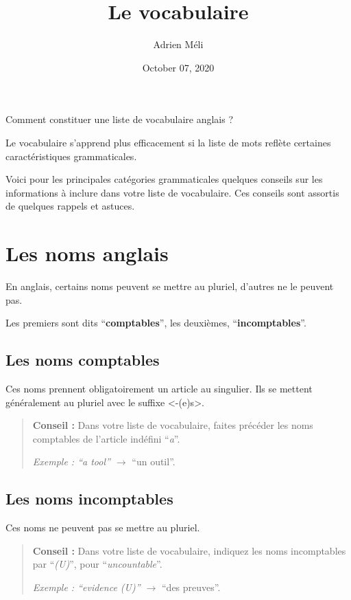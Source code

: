 \documentclass[
  10pt,
]{article}
\title{Le vocabulaire}
\author{Adrien Méli}
\date{October 07, 2020}
\begin{document}
\maketitle

{
\setcounter{tocdepth}{1}
\tableofcontents
}
Comment constituer une liste de vocabulaire anglais ?

Le vocabulaire s'apprend plus efficacement si la liste de mots reflète certaines caractéristiques grammaticales.

Voici pour les principales catégories grammaticales quelques conseils sur les informations à inclure dans votre liste de vocabulaire.
Ces conseils sont assortis de quelques rappels et astuces.

\hypertarget{les-noms-anglais}{%
\section{Les noms anglais}\label{les-noms-anglais}}

En anglais, certains noms peuvent se mettre au pluriel, d'autres ne le peuvent pas.

Les premiers sont dits ``\textbf{comptables}'', les deuxièmes, ``\textbf{incomptables}''.

\hypertarget{les-noms-comptables}{%
\subsection{Les noms comptables}\label{les-noms-comptables}}

Ces noms prennent obligatoirement un article au singulier.
Ils se mettent généralement au pluriel avec le suffixe \textless-(e)s\textgreater.

\begin{quote}
\textbf{Conseil :} Dans votre liste de vocabulaire, faites précéder les noms comptables de l'article indéfini ``\emph{a}''.

\emph{Exemple : ``a tool'' \(\rightarrow\)} ``un outil''.
\end{quote}

\hypertarget{les-noms-incomptables}{%
\subsection{Les noms incomptables}\label{les-noms-incomptables}}

Ces noms ne peuvent pas se mettre au pluriel.

\begin{quote}
\textbf{Conseil :} Dans votre liste de vocabulaire, indiquez les noms incomptables par ``\emph{(U)}'', pour ``\emph{uncountable}''.

\emph{Exemple : ``evidence (U)'' \(\rightarrow\)} ``des preuves''.
\end{quote}
\end{document}
